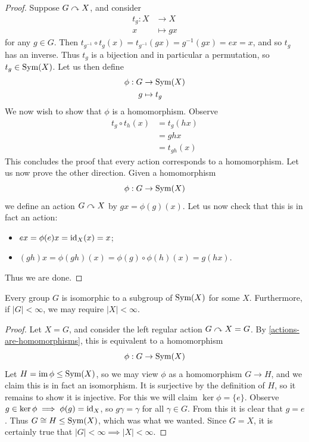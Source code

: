 \documentclass{../template/note}
\begin{document}
    \begin{proof}
        Suppose \(G \curvearrowright X\), and consider
        \begin{align*}
            t_g: X &\to X \\
            x &\mapsto gx
        \end{align*}
        for any \(g \in G\). Then \(t_{g^{-1}} \circ t_g(x) = t_{g^{-1}}(gx) = g^{-1}(gx) = ex = x\), and so \(t_g\) has an inverse. Thus \(t_g\) is a bijection and in particular a permutation, so \(t_g \in \operatorname{Sym}(X)\). Let us then define
        \begin{align*}
            \phi: G &\to \operatorname{Sym}(X) \\
            g &\mapsto t_g
        \end{align*}
        We now wish to show that \(\phi\) is a homomorphism. Observe
        \begin{align*}
            t_g \circ t_h (x) &= t_g(hx) \\
            &= ghx \\
            &= t_{gh}(x)
        \end{align*}
        This concludes the proof that every action corresponds to a homomorphism. Let us now prove the other direction. Given a homomorphism
        \[
            \phi: G \to \operatorname{Sym}(X)
        \]   
        we define an action \(G \curvearrowright X\) by \(gx = \phi(g)(x)\). Let us now check that this is in fact an action:
        \begin{itemize}
            \item \(ex = \phi(e)x = \operatorname{id}_X(x) = x\);
            \item \((gh)x = \phi(gh)(x) = \phi(g) \circ \phi(h)(x) = g(hx)\).
        \end{itemize}
        Thus we are done.           
    \end{proof}
    
    \begin{theorem}[Cayley]
        Every group \(G\) is isomorphic to a subgroup of \(\operatorname{Sym}(X)\) for some \(X\). Furthermore, if \(|G| < \infty\), we may require \(|X| < \infty\).
    \end{theorem}
    
    \begin{proof}
        Let \(X = G\), and consider the left regular action \(G \curvearrowright X=G\). By \cref{actions-are-homomorphisms}, this is equivalent to a homomorphism
        \[
            \phi: G \to \operatorname{Sym}(X)
        \]
        Let \(H = \operatorname{im} \phi \leq \operatorname{Sym}(X)\), so we may view \(\phi\) as a homomorphism \(G \to H\), and we claim this is in fact an isomorphism. It is surjective by the definition of \(H\), so it remains to show it is injective. For this we will claim \(\ker \phi = \{e\}\). Observe \(g \in \ker \phi \implies \phi(g) = \operatorname{id}_X\), so \(g\gamma = \gamma\) for all \(\gamma \in G\). From this it is clear that \(g = e\). Thus \(G \cong H \leq \operatorname{Sym}(X)\), which was what we wanted. Since \(G = X\), it is certainly true that \(|G| < \infty \implies |X| < \infty\).
    \end{proof}
    
\end{document}
